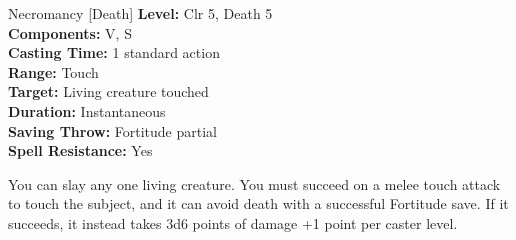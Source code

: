 {Necromancy [Death]}
{
	\textbf{Level:}
	Clr 5, Death 5\\
	\textbf{Components:}
	V, S\\
	\textbf{Casting Time:}
	1 standard action\\
	\textbf{Range:}
	Touch\\
	\textbf{Target:}
	Living creature touched\\
	\textbf{Duration:}
	Instantaneous\\
	\textbf{Saving Throw:}
	Fortitude partial\\
	\textbf{Spell Resistance:}
	Yes\\
}
{
	You can slay any one living creature. You must succeed on a melee touch attack to touch the subject, and it can avoid death with a successful Fortitude save. If it succeeds, it instead takes 3d6 points of damage +1 point per caster level.

}
